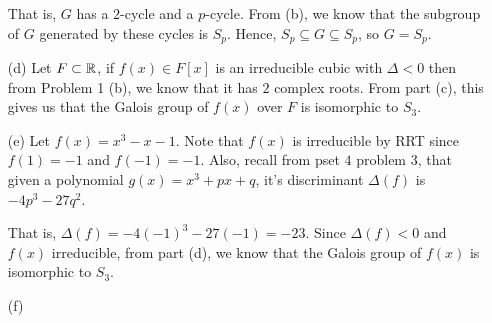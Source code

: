 \documentclass[12pt]{article}
\begin{document}
\begin{solution}
\begin{enumerate}
        That is, $G$ has a $2$-cycle and a $p$-cycle. From (b), we know that the subgroup of $G$ generated by these cycles is $S_p$. Hence, $S_p \subseteq G \subseteq S_p$, so $G = S_p$. 

        \item [(d)] Let $F \subset \mathbb R$, if $f(x) \in F[x]$ is an irreducible cubic with $\Delta <0$ then from Problem 1 (b), we know that it has $2$ complex roots. From part (c), this gives us that the Galois group of $f(x)$ over $F$ is isomorphic to $S_3$.
        \item [(e)] Let $f(x) = x^3 - x -1$. 
        Note that $f(x)$ is irreducible by RRT since $f(1) = -1$ and $f(-1) = -1$. Also, recall from pset $4$ problem 3, that given a polynomial $g(x) = x^3 + px + q$, it's discriminant $\Delta(f)$ is $-4p^3 - 27q^2$.         

        That is, $\Delta(f) = -4(-1)^3 - 27(-1) = -23$. Since $\Delta(f) <0$ and $f(x)$ irreducible, from part (d), we know that the Galois group of $f(x)$ is isomorphic to $S_3$.

        \item [(f)] 




\end{enumerate}
\end{solution}
\end{document}
